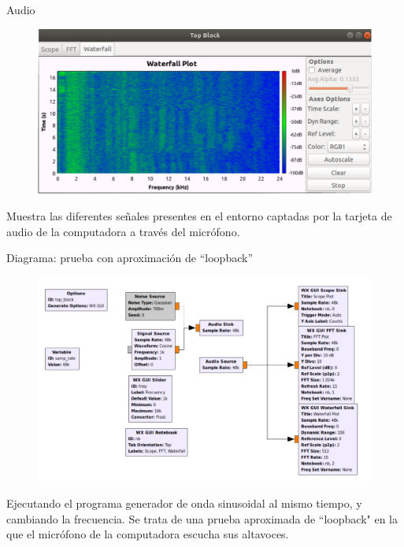 \begin{frame}{Audio}

\begin{figure}
\begin{center}
\vspace{-8mm}
\includegraphics[width=\textwidth, height=0.65\paperheight]{parte1/lab3/pdf/lab3_8.pdf}
\end{center}
\end{figure}
\vspace{-2cm}
Muestra las diferentes señales presentes en el entorno captadas por la tarjeta de audio de la computadora a través del micrófono.

\end{frame}

\begin{frame}{Diagrama: prueba con aproximación de “loopback”}

\begin{figure}
\begin{center}
\vspace{-6mm}
\includegraphics[width=\textwidth, height=0.6\paperheight]{parte1/lab3/pdf/lab3_9.pdf}
\end{center}
\end{figure}
\vspace{-5mm}
\tiny
Ejecutando el programa generador de onda sinusoidal al mismo tiempo, y cambiando la frecuencia. Se trata de una prueba aproximada de “loopback" en la que el micrófono de la computadora escucha sus altavoces.

\end{frame}

